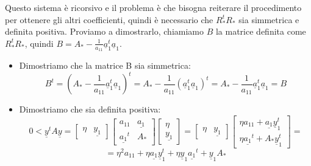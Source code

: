 Questo sistema è ricorsivo e il problema è che bisogna reiterare il procedimento
per ottenere gli altri coefficienti, quindi è necessario che $R_\ast ^t R_\ast$
sia simmetrica e definita positiva. Proviamo a dimostrarlo, chiamiamo $B$ la
matrice definita come $R_\ast ^t R_\ast$, quindi $B = A_\ast - \frac{1}{a_{11}}
    \underline{a}_1^t \underline{a}_1$.
\begin{itemize}
    \item Dimostriamo che la matrice B sia simmetrica:
          \begin{equation*}
              B^t = \left(A_\ast - \frac{1}{a_{11}} \underline{a}_1^t
              \underline{a}_1\right)^t= A_\ast - \frac{1}{a_{11}} (\underline{a}_1^t
              \underline{a}_1)^t =A_\ast - \frac{1}{a_{11}} \underline{a}_1^t
              \underline{a}_1 = B
          \end{equation*}
    \item Dimostriamo che sia definita positiva:
          \begin{equation*}
              0<\underline{y}^t A \underline{y} = \left[\begin{array}{cc}
                      \eta & \underline{y_1}
                  \end{array}\right]\left[\begin{array}{c|ccc}
                      a_{11}            & \underline{a_1} \\
                      \hline
                      \underline{a_1}^t & A_\ast
                  \end{array}\right]\left[\begin{array}{c}
                      \eta \\
                      \underline{y_1}
                  \end{array}\right] = \left[\begin{array}{cc}
                      \eta & \underline{y_1}
                  \end{array}\right]\left[\begin{array}{c}
                      \eta a_{11}+\underline{a_1}\underline{y}_1^t \\
                      \eta\underline{a_1}^t + A_\ast \underline{y}_1^t
                  \end{array}\right] =
          \end{equation*}
          \begin{equation*}
              = \eta^2 a_{11}+\eta\underline{a_1}\underline{y}_1^t+\eta
              \underline{y}_1\underline{a_1}^t + \underline{y}_1 A_\ast

\end{equation*}
\end{itemize}
